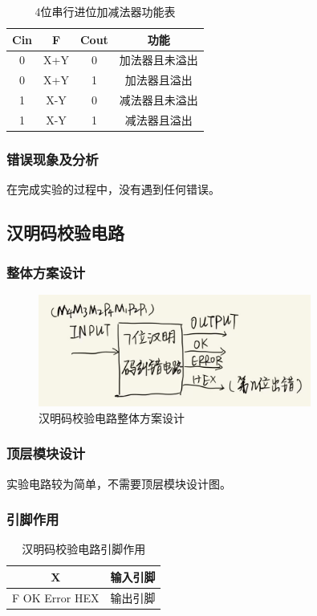 \documentclass{article}
\begin{document}
    \begin{table}[H]
    \centering
    \begin{tabular}{|c|c|c|c|}
        \hline
        Cin & F & Cout & 功能 \\ \hline
        0 & X+Y & 0 & 加法器且未溢出 \\ \hline
        0 & X+Y & 1 & 加法器且溢出 \\ \hline
        1 & X-Y & 0 & 减法器且未溢出 \\ \hline
        1 & X-Y & 1 & 减法器且溢出 \\ \hline
    \end{tabular}
    \caption{4位串行进位加减法器功能表}
    \end{table}

    \subsubsection{错误现象及分析}
    在完成实验的过程中，没有遇到任何错误。

    \subsection{汉明码校验电路}

    \subsubsection{整体方案设计}
    \begin{figure}[H]
    \centering
    \includegraphics[width=0.8\textwidth]{5.1.png}
    \caption{汉明码校验电路整体方案设计}
    \end{figure}
    
    \subsubsection{顶层模块设计}
    实验电路较为简单，不需要顶层模块设计图。

    \subsubsection{引脚作用}
    \begin{table}[H]
    \centering
    \begin{tabular}{|c|c|}
        \hline
        X & 输入引脚 \\ \hline
        F OK Error HEX & 输出引脚 \\ \hline
    \end{tabular}
    \caption{汉明码校验电路引脚作用}
    \end{table}
\end{document}
